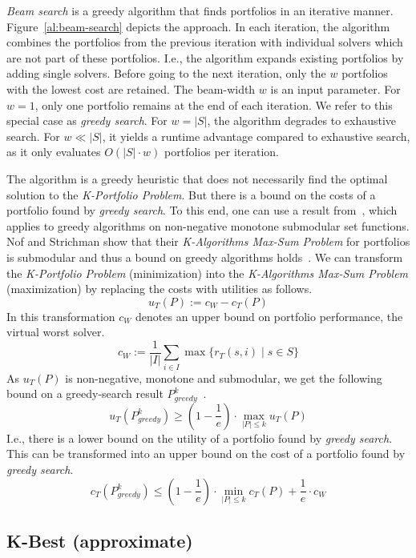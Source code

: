 \documentclass[conference]{IEEEtran}
\begin{document}
\emph{Beam search} is a greedy algorithm that finds portfolios in an iterative manner.
Figure~\ref{al:beam-search} depicts the approach. 
In each iteration, the algorithm combines the portfolios from the previous iteration with individual solvers which are not part of these portfolios. 
I.e., the algorithm expands existing portfolios by adding single solvers. 
Before going to the next iteration, only the $w$ portfolios with the lowest cost are retained.
The beam-width $w$ is an input parameter.
For $w=1$, only one portfolio remains at the end of each iteration.
We refer to this special case as \emph{greedy search}.
For $w = |S|$, the algorithm degrades to exhaustive search. 
For $w \ll |S|$, it yields a runtime advantage compared to exhaustive search, as it only evaluates $O(|S| \cdot w)$ portfolios per iteration. 

The algorithm is a greedy heuristic that does not necessarily find the optimal solution to the \emph{K-Portfolio Problem}. 
But there is a bound on the costs of a portfolio found by \emph{greedy search}. 
To this end, one can use a result from~\cite{nemhauser1978analysis}, which applies to greedy algorithms on non-negative monotone submodular set functions.
Nof and Strichman show that their \emph{K-Algorithms Max-Sum Problem} for portfolios is submodular and thus a bound on greedy algorithms holds~\cite{nof2020real}. 
We can transform the \emph{K-Portfolio Problem} (minimization) into the \emph{K-Algorithms Max-Sum Problem} (maximization) by replacing the costs with utilities as follows.%
$$
u_{T}(P) := c_W - c_{T}(P)
$$
In this transformation $c_W$ denotes an upper bound on portfolio performance, the virtual worst solver.%
$$
c_W := \frac{1}{|I|} \sum_{i \in I}{\max\{{r_T(s,i) \mid s \in S}}\}
$$
As $u_{T}(P)$ is non-negative, monotone and submodular, we get the following bound on a greedy-search result $P_{greedy}^k$~\cite{nemhauser1978analysis, krause2014submodular}.%
$$
	u_{T}(P_{greedy}^k) \geq (1 - \frac{1}{e}) \cdot \max_{|P| \leq k}{u_{T}(P)}
$$
I.e., there is a lower bound on the utility of a portfolio found by \emph{greedy search}.
This can be transformed into an upper bound on the cost of a portfolio found by \emph{greedy search}.%
\begin{equation}
	c_{T}(P_{greedy}^k) \leq (1 - \frac{1}{e}) \cdot \min_{|P| \leq k}{c_{T}(P)} + \frac{1}{e} \cdot c_W
	\label{eq:upper-bound}
\end{equation}

\subsection{K-Best (approximate)}
\end{document}
